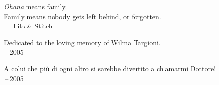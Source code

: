 \thispagestyle{empty}
{}

\vspace*{3cm}

\begin{center}
    \emph{Ohana} means family. \\
    Family means nobody gets left behind, or forgotten. \\ \medskip
    --- Lilo \& Stitch    
\end{center}

\medskip

\begin{center}
    Dedicated to the loving memory of Wilma Targioni. \\ \,--\,2005
\end{center}

\begin{center}
    A colui che pi\`u di ogni altro si sarebbe divertito a chiamarmi \flqq Dottore! \frqq \\ \,--\,2005
\end{center}
